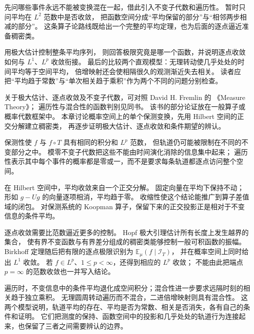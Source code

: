 \ProseParagraphBreak

先问哪些事件永远不能被变换混在一起，借此引入不变子代数和遍历性。
暂时只问平均在 \(L^2\) 范数中是否收敛，
把函数空间分成“平均保留的部分”与“相邻两步相减的部分”。
这条算子论路线既给出一个完整的平均定理，也为后面的逐点逼近准备稠密类。

\ProseParagraphBreak

用极大估计控制整条平均序列，
则回答极限究竟是哪一个函数，并说明逐点收敛如何与 \(L^1\)、\(L^p\) 收敛衔接。
最后的比较两个直观模型：无理转动使几乎处处的时间平均等于空间平均，
倍增映射还会使相隔很久的观测渐近失去相关。
读者应把“平均趋于常数”与“单次相关趋于乘积”作为两个不同的问题分别检查。

\ProseParagraphBreak

关于极大估计、逐点收敛及不变子代数，可对照 David H. Fremlin 的
《Measure Theory》\cite[372A--D, 372H--J]{Fremlin2016Measure}；
遍历性与混合性的函数判别见同书\cite[372O--Q]{Fremlin2016Measure}。
该书的部分论证放在一般算子或概率代数框架中。
本章讨论概率空间上的单个保测变换，先用 Hilbert 空间的正交分解建立稠密类，
再逐步证明极大估计、逐点收敛和条件期望的辨认。







\begin{chaptersummary}
保测性使 \(f\) 与 \(f\circ T\) 具有相同的积分和 \(L^p\) 范数，
但轨道仍可能被限制在不同的不变部分之中。
模零不变子代数把这些不能由时间演化消除的信息集中起来；
遍历性表示其中每个事件的概率都是零或一，而不是要求每条轨道都逐点访问整个空间。

\ProseParagraphBreak

在 Hilbert 空间中，平均收敛来自一个正交分解。
固定向量在平均下保持不动；形如 \(g-Ug\) 的向量逐项相消，平均趋于零。
收缩性使这个结论能推广到算子差值域的闭包。
对保测系统的 Koopman 算子，保留下来的正交投影正是相对于不变信息的条件平均。

\ProseParagraphBreak

逐点收敛需要比范数逼近更多的控制。
Hopf 极大引理估计所有长度上发生越界的集合，
使有界不变函数与有界差分组成的稠密类能够控制一般可积函数的振幅。
Birkhoff 定理随后把有限的逐点极限识别为 \(\mathbb E_\mu(f\mid\mathcal I_T)\)，
并在概率空间上同时给出 \(L^1\) 收敛。
若 \(f\in L^p\)、\(1\leq p<\infty\)，还得到相应的 \(L^p\) 收敛；
不能由此把端点 \(p=\infty\) 的范数收敛也一并写入结论。

\ProseParagraphBreak

遍历时，不变信息中的条件平均退化成空间积分；混合性进一步要求远隔时刻的相关趋于独立乘积。
无理圆周转动遍历而不混合，二进倍增映射则具有混合性。
这两个模型说明，轨道平均的存在、平均是否为常数、相关是否消失，各有自己的条件和证明。
它们把测度的保持、函数空间中的投影和几乎处处的轨道行为连接起来，也保留了三者之间需要辨认的边界。
\end{chaptersummary}

